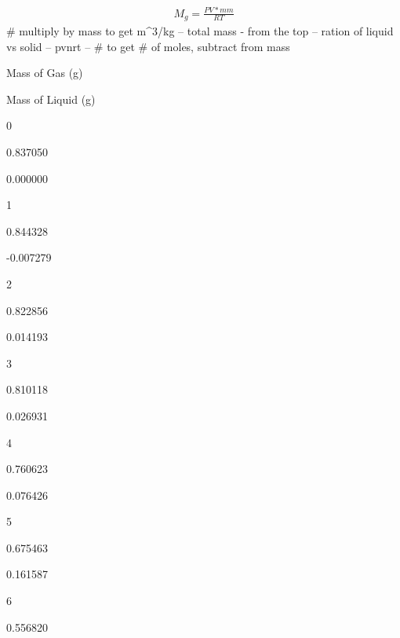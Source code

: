 \begin{align}
M_g = \frac{PV*mm}{RT}
\end{align} \# multiply by mass to get m\^{}3/kg -- total mass - from
the top -- ration of liquid vs solid -- pvnrt -- \# to get \# of moles,
subtract from mass

\begin{Shaded}
\begin{Highlighting}[]
\OperatorTok{=}  \OperatorTok{+} 
\OperatorTok{=}\OperatorTok{*}
\OperatorTok{=}\NormalTok{ m_gs[}\NormalTok{] }
\OperatorTok{=}\NormalTok{ df2[}\NormalTok{]}\OperatorTok{*}\NormalTok{df2[}\NormalTok{]}\OperatorTok{*}\OperatorTok{/}
\OperatorTok{=}\OperatorTok{-}
\OperatorTok{=}\NormalTok{ \{}
\OperatorTok{=}
\end{Highlighting}
\end{Shaded}

Mass of Gas (g)

Mass of Liquid (g)

0

0.837050

0.000000

1

0.844328

-0.007279

2

0.822856

0.014193

3

0.810118

0.026931

4

0.760623

0.076426

5

0.675463

0.161587

6

0.556820

